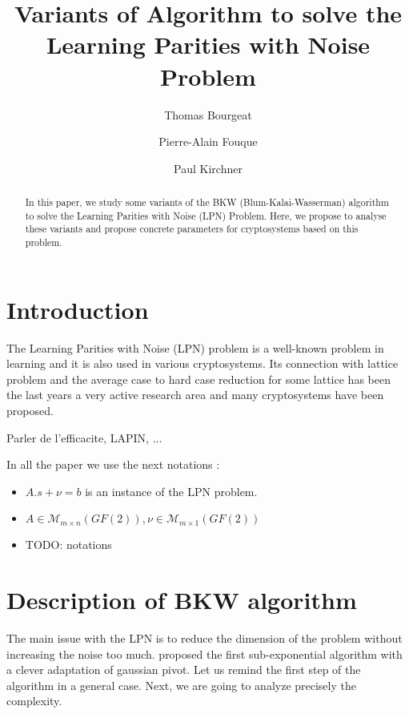 \documentclass{llncs}		%
\begin{document}
\title{Variants of Algorithm to solve the Learning Parities with Noise Problem}
\author{Thomas Bourgeat \and Pierre-Alain Fouque \and Paul Kirchner}

\maketitle

\begin{abstract}
In this paper, we study some variants of the BKW (Blum-Kalai-Wasserman) algorithm to solve the Learning Parities with Noise (LPN) Problem. Here, we propose to analyse these variants and propose concrete parameters for cryptosystems based on this problem. 
\end{abstract}

\section{Introduction}
The Learning Parities with Noise (LPN) problem is 
a well-known problem in learning and it is also used 
in various cryptosystems. 
Its connection with lattice problem and the average case to hard
 case reduction for some lattice has been the last years
 a very active research area and many cryptosystems have been proposed. 

Parler de l'efficacite, LAPIN, ... 

In all the paper we use the next notations :
\begin{itemize}
\item $A.s+\nu = b$ is an instance of the LPN problem.
\item $A\in \mathcal{M}_{m\times n}(GF(2)), \nu\in \mathcal{M}_{m\times
1}(GF(2))$
\item TODO: notations
\end{itemize}

\section{Description of BKW algorithm}
The main issue with the LPN is to reduce the dimension of the problem without
increasing the noise too much. \cite{BKW} proposed the first sub-exponential
algorithm with a clever adaptation of gaussian pivot. Let us remind the first
step of the algorithm in a general case. Next, we are going to analyze precisely
the complexity.
\end{document}
